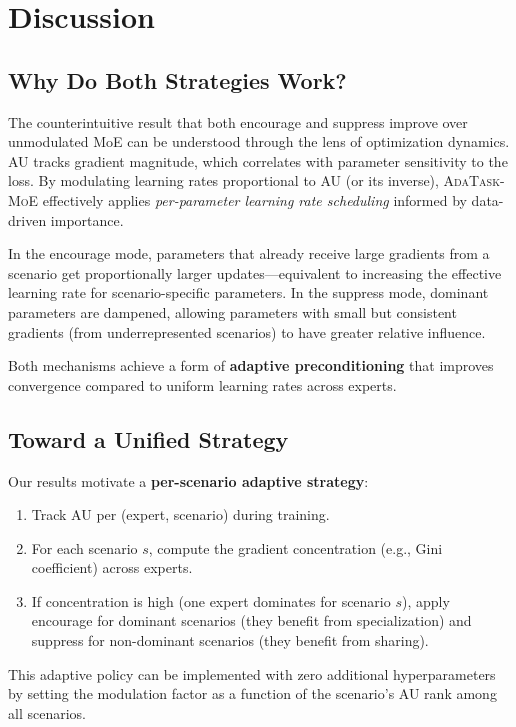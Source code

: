 \documentclass{article}
\begin{document}
\section{Discussion}
\label{sec:discussion}

\subsection{Why Do Both Strategies Work?}
The counterintuitive result that both encourage and suppress improve over unmodulated MoE can be understood through the lens of optimization dynamics.
AU tracks gradient magnitude, which correlates with parameter sensitivity to the loss.
By modulating learning rates proportional to AU (or its inverse), \textsc{AdaTask-MoE} effectively applies \emph{per-parameter learning rate scheduling} informed by data-driven importance.

In the encourage mode, parameters that already receive large gradients from a scenario get proportionally larger updates---equivalent to increasing the effective learning rate for scenario-specific parameters.
In the suppress mode, dominant parameters are dampened, allowing parameters with small but consistent gradients (from underrepresented scenarios) to have greater relative influence.

Both mechanisms achieve a form of \textbf{adaptive preconditioning} that improves convergence compared to uniform learning rates across experts.

\subsection{Toward a Unified Strategy}
Our results motivate a \textbf{per-scenario adaptive strategy}:
\begin{enumerate}
    \item Track AU per (expert, scenario) during training.
    \item For each scenario $s$, compute the gradient concentration (e.g., Gini coefficient) across experts.
    \item If concentration is high (one expert dominates for scenario $s$), apply encourage for dominant scenarios (they benefit from specialization) and suppress for non-dominant scenarios (they benefit from sharing).
\end{enumerate}
This adaptive policy can be implemented with zero additional hyperparameters by setting the modulation factor as a function of the scenario's AU rank among all scenarios.
\end{document}
